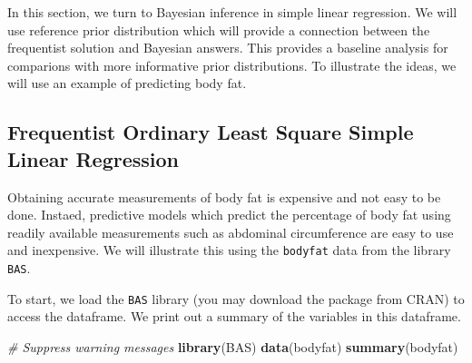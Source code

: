 \documentclass[]{book}
\newenvironment{Shaded}{\begin{snugshade}}{\end{snugshade}}
\newcommand{\KeywordTok}[1]{\textcolor[rgb]{0.13,0.29,0.53}{\textbf{{#1}}}}
\newcommand{\CommentTok}[1]{\textcolor[rgb]{0.56,0.35,0.01}{\textit{{#1}}}}
\newcommand{\NormalTok}[1]{{#1}}
\theoremstyle{definition}
\theoremstyle{definition}
\theoremstyle{definition}
\theoremstyle{remark}
\begin{document}
In this section, we turn to Bayesian inference in simple linear
regression. We will use reference prior distribution which will provide
a connection between the frequentist solution and Bayesian answers. This
provides a baseline analysis for comparions with more informative prior
distributions. To illustrate the ideas, we will use an example of
predicting body fat.

\subsection{Frequentist Ordinary Least Square Simple Linear
Regression}\label{frequentist-ordinary-least-square-simple-linear-regression}

Obtaining accurate measurements of body fat is expensive and not easy to
be done. Instaed, predictive models which predict the percentage of body
fat using readily available measurements such as abdominal circumference
are easy to use and inexpensive. We will illustrate this using the
\texttt{bodyfat} data from the library \texttt{BAS}.

To start, we load the \texttt{BAS} library (you may download the package
from CRAN) to access the dataframe. We print out a summary of the
variables in this dataframe.

\begin{Shaded}
\begin{Highlighting}[]
\CommentTok{# Suppress warning messages}
\KeywordTok{library}\NormalTok{(BAS)}
\KeywordTok{data}\NormalTok{(bodyfat)}
\KeywordTok{summary}\NormalTok{(bodyfat)}
\end{Highlighting}
\end{Shaded}
\end{document}
